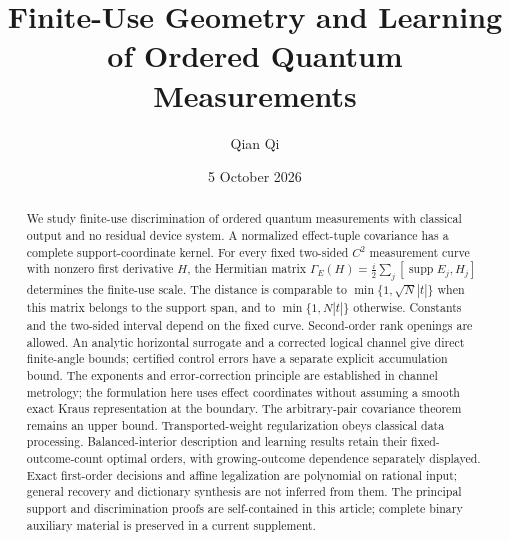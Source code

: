 \documentclass[11pt]{amsart}
\title[Finite-use measurement geometry and learning]{Finite-Use Geometry and Learning of Ordered Quantum Measurements}
\author{Qian Qi}
\date{5 October 2026}
\numberwithin{equation}{section}
\theoremstyle{definition}\newtheorem{definition}[theorem]{Definition}
\theoremstyle{remark}\newtheorem{remark}[theorem]{Remark}
\begin{document}
\raggedbottom
\begin{abstract}
We study finite-use discrimination of ordered quantum measurements
with classical output and no residual device system.  A normalized
effect-tuple covariance has a complete support-coordinate kernel.
For every fixed two-sided $C^2$ measurement curve with nonzero first
derivative $H$, the Hermitian matrix
$\Gamma_E(H)=\frac i2\sum_j[\operatorname{supp}E_j,H_j]$
determines the finite-use scale.  The distance is comparable to
$\min\{1,\sqrt N|t|\}$ when this matrix belongs to the support span,
and to $\min\{1,N|t|\}$ otherwise.  Constants and the two-sided
interval depend on the fixed curve.  Second-order rank openings
are allowed.  An analytic horizontal surrogate and a corrected
logical channel give direct finite-angle bounds; certified control
errors have a separate explicit accumulation bound.
The exponents and error-correction principle are established in
channel metrology; the formulation here uses effect coordinates
without assuming a smooth exact Kraus representation at the boundary.
The arbitrary-pair covariance theorem remains an upper bound.
Transported-weight regularization obeys classical data processing.
Balanced-interior description and learning results retain their
fixed-outcome-count optimal orders, with growing-outcome dependence
separately displayed.  Exact first-order decisions and affine
legalization are polynomial on rational input; general recovery and
dictionary synthesis are not inferred from them.  The principal
support and discrimination proofs are self-contained in this article;
complete binary auxiliary material is preserved in a current supplement.
\end{abstract}
\maketitle













\end{document}
